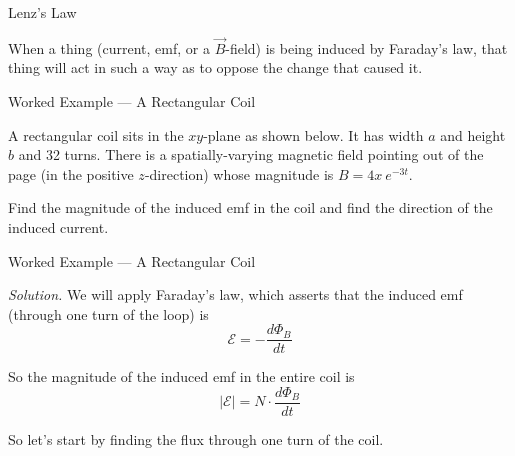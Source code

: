 \documentclass{beamer}
\begin{document}
\begin{frame}{Lenz's Law}

When a thing (current, emf, or a $\vec{B}$-field) is being induced by Faraday's law, that thing will act in such a way as to oppose the change that caused it.
    
\end{frame}

\begin{frame}{Worked Example --- A Rectangular Coil}

A rectangular coil sits in the $xy$-plane as shown below. It has width $a$ and height $b$ and 32 turns. There is a spatially-varying magnetic field pointing out of the page (in the positive $z$-direction) whose magnitude is $B = 4x\ e^{-3t}$.

\begin{figure}[H]
\centering
{}
\end{figure}

Find the magnitude of the induced emf in the coil and find the direction of the induced current.

\end{frame}

\begin{frame}{Worked Example --- A Rectangular Coil}

    \textit{Solution.} We will apply Faraday's law, which asserts that the induced emf (through one turn of the loop) is
\begin{equation*}
	\mathcal{E} = -\frac{d\Phi_B}{dt}
\end{equation*}

So the magnitude of the induced emf in the entire coil is
\begin{equation*}
	\left| \mathcal{E} \right| = N \cdot \frac{d\Phi_B}{dt}
\end{equation*}

\begin{center}
    So let's start by finding the flux through one turn of the coil.
\end{center}

\end{frame}
\end{document}
